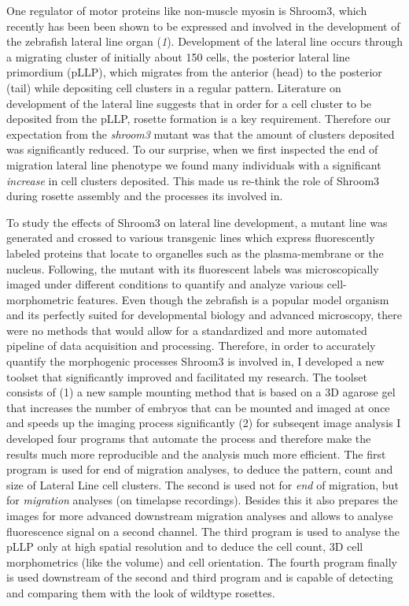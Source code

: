 \documentclass[11pt,singlespacinge,twoside]{reedthesis} %
\theoremstyle{definition}
\theoremstyle{definition}
\theoremstyle{definition}
\theoremstyle{remark}
\begin{document}
One regulator of motor proteins like non-muscle myosin is Shroom3, which recently has been been shown to be expressed and involved in the development of the zebrafish lateral line organ (\emph{1}). Development of the lateral line occurs through a migrating cluster of initially about 150 cells, the posterior lateral line primordium (pLLP), which migrates from the anterior (head) to the posterior (tail) while depositing cell clusters in a regular pattern. Literature on development of the lateral line suggests that in order for a cell cluster to be deposited from the pLLP, rosette formation is a key requirement. Therefore our expectation from the \emph{shroom3} mutant was that the amount of clusters deposited was significantly reduced. To our surprise, when we first inspected the end of migration lateral line phenotype we found many individuals with a significant \emph{increase} in cell clusters deposited. This made us re-think the role of Shroom3 during rosette assembly and the processes its involved in.

To study the effects of Shroom3 on lateral line development, a mutant line was generated and crossed to various transgenic lines which express fluorescently labeled proteins that locate to organelles such as the plasma-membrane or the nucleus. Following, the mutant with its fluorescent labels was microscopically imaged under different conditions to quantify and analyze various cell-morphometric features. Even though the zebrafish is a popular model organism and its perfectly suited for developmental biology and advanced microscopy, there were no methods that would allow for a standardized and more automated pipeline of data acquisition and processing. Therefore, in order to accurately quantify the morphogenic processes Shroom3 is involved in, I developed a new toolset that significantly improved and facilitated my research. The toolset consists of (1) a new sample mounting method that is based on a 3D agarose gel that increases the number of embryos that can be mounted and imaged at once and speeds up the imaging process significantly (2) for subseqent image analysis I developed four programs that automate the process and therefore make the results much more reproducible and the analysis much more efficient. The first program is used for end of migration analyses, to deduce the pattern, count and size of Lateral Line cell clusters. The second is used not for \emph{end} of migration, but for \emph{migration} analyses (on timelapse recordings). Besides this it also prepares the images for more advanced downstream migration analyses and allows to analyse fluorescence signal on a second channel. The third program is used to analyse the pLLP only at high spatial resolution and to deduce the cell count, 3D cell morphometrics (like the volume) and cell orientation. The fourth program finally is used downstream of the second and third program and is capable of detecting and comparing them with the look of wildtype rosettes.
\end{document}
